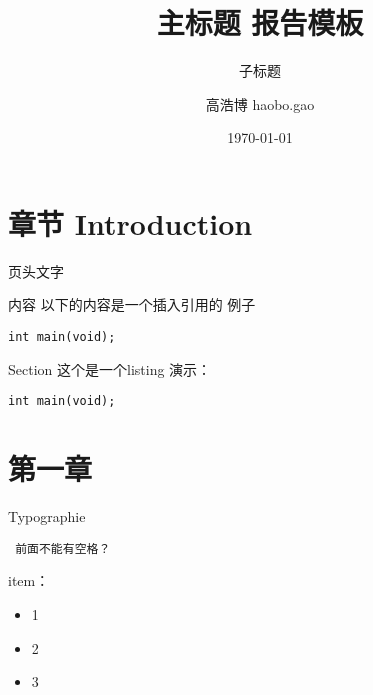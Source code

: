\documentclass[10pt]{beamer}
\title{主标题 报告模板}
\subtitle{子标题}
\date{\today}
\author{高浩博 haobo.gao}
\institute{组织 河南科技大学}
\begin{document}
\begin{frame}
	\titlepage
\end{frame}



\section{章节 Introduction}

\begin{frame}[fragile]{页头文字}

	内容 以下的内容是一个插入引用的 例子

	\begin{verbatim}
int main(void);
	\end{verbatim}
\end{frame}

\begin{frame}[fragile]{Section}
这个是一个listing 演示：
\begin{lstlisting}
int main(void);
\end{lstlisting}
\end{frame}

\section{第一章}

\begin{frame}[fragile]{Typographie}
\begin{lstlisting}
 前面不能有空格？
\end{lstlisting}

item：
\begin{itemize}
\item 1
\item 2
\item 3
\end{itemize}

\end{frame}
\end{document}
